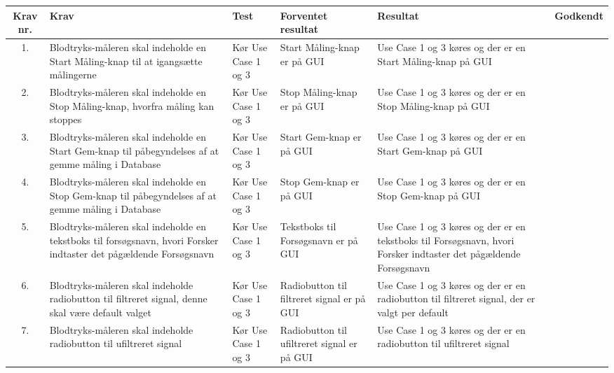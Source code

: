 \documentclass[main.tex]{subfiles}
\begin{document}
\begin{longtabu} to 
	Krav nr. & Krav & Test & Forventet resultat & Resultat & Godkendt
	\\[-1ex] \midrule
	
	1. & Blodtryks-måleren skal indeholde en Start Måling-knap til at igangsætte målingerne & Kør Use Case 1 og 3 & Start Måling-knap er på GUI & Use Case 1 og 3 køres og der er en Start Måling-knap på GUI & %
	\\ 
	\midrule
	
	2. & Blodtryks-måleren skal indeholde en Stop Måling-knap, hvorfra måling kan stoppes & Kør Use Case 1 og 3 & Stop Måling-knap er på GUI & Use Case 1 og 3 køres og der er en Stop Måling-knap på GUI & %
	\\ 
	\midrule
	
	3. & Blodtryks-måleren skal indeholde en Start Gem-knap til påbegyndelses af at gemme måling i Database & Kør Use Case 1 og 3 & Start Gem-knap er på GUI & Use Case 1 og 3 køres og der er en Start Gem-knap på GUI & %
	\\ 
	\midrule
	
	4. & Blodtryks-måleren skal indeholde en Stop Gem-knap til påbegyndelses af at gemme måling i Database & Kør Use Case 1 og 3 & Stop Gem-knap er på GUI & Use Case 1 og 3 køres og der er en Stop Gem-knap på GUI & %
	\\ 
	\midrule
	
	5. & Blodtryks-måleren skal indeholde en tekstboks til forsøgsnavn, hvori Forsker indtaster det pågældende Forsøgsnavn & Kør Use Case 1 og 3 & Tekstboks til Forsøgsnavn er på GUI & Use Case 1 og 3 køres og der er en tekstboks til Forsøgsnavn, hvori Forsker indtaster det pågældende Forsøgsnavn  & %
	\\ 
	\midrule
	
	
	6. & Blodtryks-måleren skal indeholde radiobutton til filtreret signal, denne skal være default valget & Kør Use Case 1 og 3 & Radiobutton til filtreret signal er på GUI & Use Case 1 og 3 køres og der er en radiobutton til filtreret signal, der er valgt per default  &  %
	\\ 
	\midrule
	
	
	
	7. & Blodtryks-måleren skal indeholde radiobutton til ufiltreret signal & Kør Use Case 1 og 3 & Radiobutton til ufiltreret signal er på GUI & Use Case 1 og 3 køres og der er en radiobutton til ufiltreret signal &  %
	\\ 
	\midrule
	

\end{longtabu}
\end{document}
